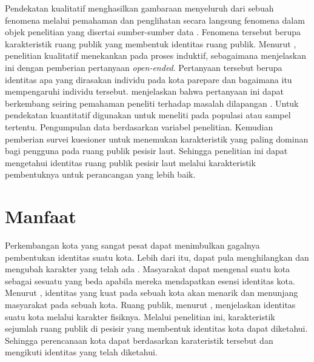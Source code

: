 \documentclass[12pt]{simart} %
\begin{document}
Pendekatan kualitatif menghasilkan gambaraan menyeluruh dari sebuah fenomena melalui pemahaman dan penglihatan secara langsung fenomena dalam objek penelitian yang disertai sumber-sumber data \citep{creswell2016}.
Fenomena tersebut berupa karakteristik ruang publik yang membentuk identitas ruang publik.
Menurut \cite{groat2013}, penelitian kualitatif menekankan  pada proses induktif, sebagaimana \citeauthor{creswell2016} menjelaskan ini dengan pemberian pertanyaan \textit{open-ended}. Pertanyaan tersebut berupa identitas apa yang dirasakan individu pada kota parepare dan bagaimana itu mempengaruhi individu tersebut.%
\cite{creswell2016} menjelaskan bahwa pertanyaan ini dapat berkembang seiring pemahaman peneliti terhadap masalah dilapangan \citep{creswell2016}.
Untuk pendekatan kuantitatif digunakan untuk meneliti pada populasi atau sampel tertentu. Pengumpulan data berdasarkan variabel penelitian. Kemudian pemberian survei kuesioner untuk menemukan karakteristik yang paling dominan bagi pengguna pada ruang publik pesisir laut.
Sehingga penelitian ini dapat mengetahui identitas ruang publik pesisir laut melalui karakteristik pembentuknya untuk perancangan yang lebih baik.

\section{Manfaat}

Perkembangan kota yang sangat pesat dapat menimbulkan gagalnya pembentukan identitas suatu kota. Lebih dari itu, dapat pula menghilangkan dan mengubah karakter yang telah ada \citep{hartanti2012}. Masyarakat dapat mengenal suatu kota sebagai sesuatu yang beda apabila mereka mendapatkan esensi identitas kota. Menurut \cite{oktay2002}, identitas yang kuat pada sebuah kota akan menarik dan menunjang masyarakat pada sebuah kota. Ruang publik, menurut \cite{hartanti2014},   menjelaskan identitas suatu kota melalui karakter fisiknya.
Melalui penelitian ini, karakteristik sejumlah ruang publik di pesisir yang membentuk identitas kota dapat diketahui. Sehingga perencanaan kota dapat berdasarkan karateristik tersebut dan mengikuti identitas yang telah diketahui.
\end{document}
